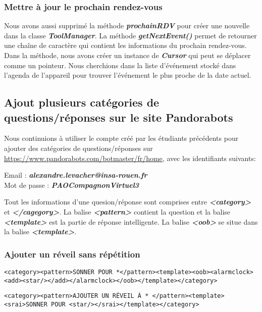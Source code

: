 \subsubsection*{Mettre à jour le prochain rendez-vous}

\indent Nous avons aussi supprimé la méthode \textbf{\emph{prochainRDV}} pour créer une nouvelle dans la classe \textbf{\emph{ToolManager}}. La méthode \textbf{\emph{getNextEvent()}} permet de retourner une chaîne de caractère qui contient les informations du prochain rendez-vous. Dans la méthode, nous avons créer un instance de \textbf{\emph{Cursor}} qui peut se déplacer comme un pointeur. Nous cherchions dans la liste d'événement stocké dans l'agenda de l'appareil pour trouver l'événement le plus proche de la date actuel.

\subsection{Ajout plusieurs catégories de questions/réponses sur le site Pandorabots}

\indent Nous continuions à utiliser le compte créé par les étudiants précédents pour ajouter des catégories de questions/réponses sur \url{https://www.pandorabots.com/botmaster/fr/home}, avec les identifiants suivants:

\begin{center}
	Email : \textbf{\emph{alexandre.levacher@insa-rouen.fr}}\\
	Mot de passe : \textbf{\emph{PAOCompagnonVirtuel3}}
\end{center}

\indent Tout les informations d'une quesion/réponse sont comprises entre \textbf{\emph{<category>}} et \textbf{\emph{</cagegory>}}. La balise \textbf{\emph{<pattern>}} contient la question et la balise \textbf{\emph{<template>}} est la partie de réponse intelligente. La balise \textbf{\emph{<oob>}} se situe dans la balise \textbf{\emph{<template>}}.

\subsubsection{Ajouter un réveil sans répétition}
\begin{lstlisting}[frame=none,aboveskip=0.5em]
<category><pattern>SONNER POUR *</pattern><template><oob><alarmclock>
<add><star/></add></alarmclock></oob></template></category>
\end{lstlisting}

\begin{lstlisting}[frame=none,aboveskip=0.5em]
<category><pattern>AJOUTER UN RÉVEIL À * </pattern><template><srai>SONNER POUR <star/></srai></template></category>
\end{lstlisting}

